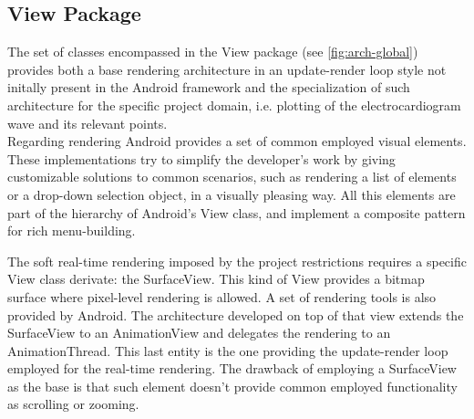 		\subsection{View Package}

		The set of classes encompassed in the View package (see \autoref{fig:arch-global}) provides both a base rendering architecture in an update-render loop style not initally present in the Android framework and the specialization of such architecture for the specific project domain, i.e. plotting of the electrocardiogram wave and its relevant points.\\

		Regarding rendering Android provides a set of common employed visual elements. These implementations try to simplify the developer's work by giving customizable solutions to common scenarios, such as rendering a list of elements or a drop-down selection object, in a visually pleasing way. All this elements are part of the hierarchy of Android's View class, and implement a composite pattern for rich menu-building.

		The soft real-time rendering imposed by the project restrictions requires a specific View  class derivate: the SurfaceView. This kind of View provides a bitmap surface where pixel-level rendering is allowed. A set of rendering tools is also provided by Android. The architecture developed on top of that view extends the SurfaceView to an AnimationView and delegates the rendering to an AnimationThread. This last entity is the one providing the update-render loop employed for the real-time rendering. The drawback of employing a SurfaceView as the base is that such element doesn't provide common employed functionality as scrolling or zooming.\\

